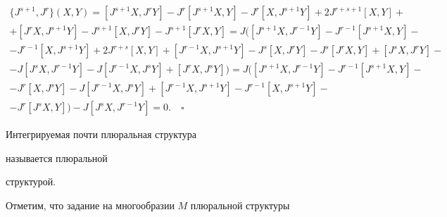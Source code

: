 \begin{gather*}


\{J^{s+1},J^{r} \}(X,Y) =


[J^{s+1}X,J^{r}Y] - J^{r}[J^{s+1}X,Y] - J^{r}[X,J^{s+1}Y]


+ 2J^{r+s+1}[X,Y] +\\


%


+ [J^{r}X,J^{s+1}Y] - J^{s+1}[X,J^{r}Y] -


J^{s+1}[J^{r}X,Y] =


J ( [J^{s+1}X,J^{r-1}Y] - J^{r-1}[J^{s+1}X,Y] -\\


%


- J^{r-1}[X,J^{s+1}Y]


+ 2J^{r+s}[X,Y] + [J^{r-1}X,J^{s+1}Y] - J^{s}[X,J^{r}Y] -


J^{s}[J^{r}X,Y]


+ [J^{s}X,J^{r}Y] -\\


%


- J[J^{s}X,J^{r-1}Y] - J[J^{r-1}X,J^{s}Y]


+ [J^{r}X,J^{s}Y] ) =


J([J^{s+1}X,J^{r-1}Y] - J^{r-1}[J^{s+1}X,Y]  -\\


%


- J^{r}[X,J^{s}Y]


- J[J^{r-1}X,J^{s}Y]  +  [J^{r-1}X,J^{s+1}Y]  -  J^{r-1}[X,J^{s+1}Y] -\\


%


- J^{r}[J^{s}X,Y]) - J[J^{s}X,J^{r-1}Y] = 0.\quad\square


\end{gather*}





\begin{defn}


Интегрируемая почти плюральная структура


называется плюральной\linebreak




структурой.


\end{defn}





Отметим, что задание на многообразии $M$ плюральной структуры


